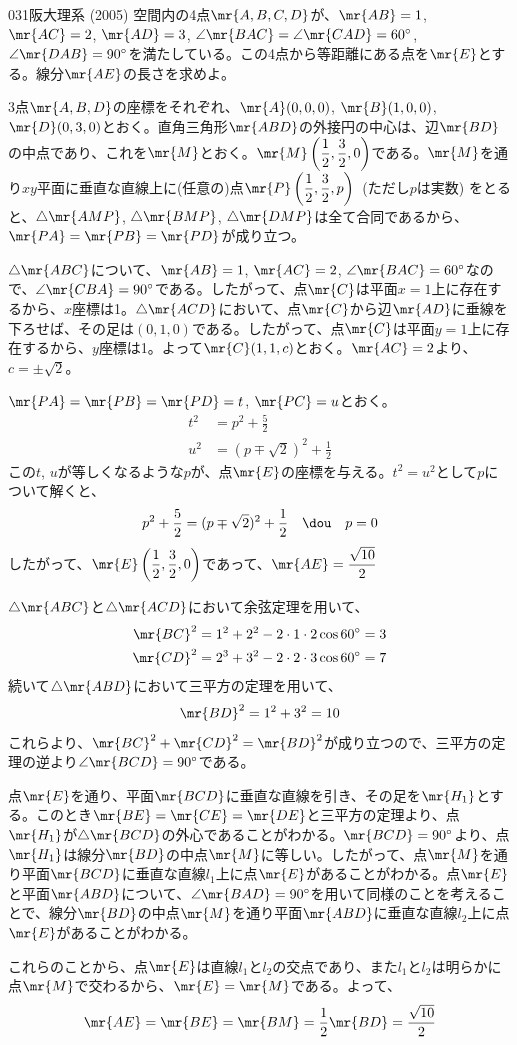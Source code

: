 \begin{prob}{031}{}{阪大理系 (2005)}
 空間内の4点$\mr{A, B, C, D}$が、$\mr{AB}=1$, $\mr{AC}=2$, $\mr{AD}=3$, $\angle\mr{BAC}=\angle\mr{CAD}=60^\circ$, $\angle\mr{DAB}=90^\circ$を満たしている。この4点から等距離にある点を$\mr{E}$とする。線分$\mr{AE}$の長さを求めよ。
\end{prob}
3点$\mr{A, B, D}$の座標をそれぞれ、$\mr{A}(0, 0, 0)$, $\mr{B}(1, 0, 0)$, $\mr{D}(0, 3, 0)$とおく。直角三角形$\mr{ABD}$の外接円の中心は、辺$\mr{BD}$の中点であり、これを$\mr{M}$とおく。$\mr{M}\left(\dfrac{1}{2}, \dfrac{3}{2}, 0\right)$である。$\mr{M}$を通り$xy$平面に垂直な直線上に(任意の)点$\mr{P}\left(\dfrac{1}{2}, \dfrac{3}{2}, p\right)$~(ただし$p$は実数) をとると、$\triangle\mr{AMP}$, $\triangle
\mr{BMP}$, $\triangle\mr{DMP}$は全て合同であるから、$\mr{PA}=\mr{PB}=\mr{PD}$が成り立つ。

$\triangle\mr{ABC}$について、$\mr{AB}=1$, $\mr{AC}=2$, $\angle\mr{BAC}=60^\circ$なので、$\angle\mr{CBA}=90^\circ$である。したがって、点$\mr{C}$は平面$x=1$上に存在するから、$x$座標は1。$\triangle\mr{ACD}$において、点$\mr{C}$から辺$\mr{AD}$に垂線を下ろせば、その足は$(0, 1, 0)$である。したがって、点$\mr{C}$は平面$y=1$上に存在するから、$y$座標は1。よって$\mr{C}(1, 1, c)$とおく。$\mr{AC}=2$より、$c=\pm\sqrt{2}$。

$\mr{PA}=\mr{PB}=\mr{PD}=t$, $\mr{PC}=u$とおく。
\begin{align*}
 t^2&=p^2+\frac{5}{2} \\
 u^2&=(p\mp\sqrt{2})^2+\frac{1}{2}
\end{align*}
この$t$, $u$が等しくなるような$p$が、点$\mr{E}$の座標を与える。$t^2=u^2$として$p$について解くと、
\[ p^2+\frac{5}{2}=(p\mp\sqrt{2})^2+\frac{1}{2} \quad\dou\quad p=0 \]
したがって、$\mr{E}\left(\dfrac{1}{2}, \dfrac{3}{2}, 0\right)$であって、$\mr{AE}=\dfrac{\sqrt{10}}{2}$

$\triangle\mr{ABC}$と$\triangle\mr{ACD}$において余弦定理を用いて、
\begin{align*}
 \mr{BC}^2&=1^2+2^2-2\cdot 1\cdot 2\cos 60^\circ=3 \\
 \mr{CD}^2&=2^3+3^2-2\cdot 2\cdot 3\cos 60^\circ=7
\end{align*}
続いて$\triangle\mr{ABD}$において三平方の定理を用いて、
\[ \mr{BD}^2=1^2+3^2=10 \]
これらより、$\mr{BC}^2+\mr{CD}^2=\mr{BD}^2$が成り立つので、三平方の定理の逆より$\angle\mr{BCD}=90^\circ$である。

点$\mr{E}$を通り、平面$\mr{BCD}$に垂直な直線を引き、その足を$\mr{H_1}$とする。このとき$\mr{BE}=\mr{CE}=\mr{DE}$と三平方の定理より、点$\mr{H_1}$が$\triangle\mr{BCD}$の外心であることがわかる。$\mr{BCD}=90^\circ$より、点$\mr{H_1}$は線分$\mr{BD}$の中点$\mr{M}$に等しい。したがって、点$\mr{M}$を通り平面$\mr{BCD}$に垂直な直線$l_1$上に点$\mr{E}$があることがわかる。点$\mr{E}$と平面$\mr{ABD}$について、$\angle\mr{BAD}=90^\circ$を用いて同様のことを考えることで、線分$\mr{BD}$の中点$\mr{M}$を通り平面$\mr{ABD}$に垂直な直線$l_2$上に点$\mr{E}$があることがわかる。

これらのことから、点$\mr{E}$は直線$l_1$と$l_2$の交点であり、また$l_1$と$l_2$は明らかに点$\mr{M}$で交わるから、$\mr{E}=\mr{M}$である。よって、
\[ \mr{AE}=\mr{BE}=\mr{BM}=\frac{1}{2}\mr{BD}=\frac{\sqrt{10}}{2} \]